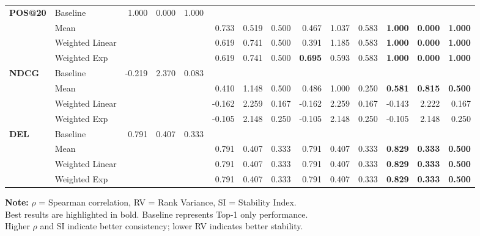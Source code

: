 \documentclass{article}
\begin{document}
\begin{table}[htbp]
\begin{tabular}{@{}llrrr|rrr|rrr|rrr@{}}
\multirow{4}{*}{\textbf{POS@20}} 
& Baseline & 1.000 & 0.000 & 1.000 & & & & & & & & & \\
& Mean & & & & 0.733 & 0.519 & 0.500 & 0.467 & 1.037 & 0.583 & \textbf{1.000} & \textbf{0.000} & \textbf{1.000} \\
& Weighted Linear & & & & 0.619 & 0.741 & 0.500 & 0.391 & 1.185 & 0.583 & \textbf{1.000} & \textbf{0.000} & \textbf{1.000} \\
& Weighted Exp & & & & 0.619 & 0.741 & 0.500 & \textbf{0.695} & 0.593 & 0.583 & \textbf{1.000} & \textbf{0.000} & \textbf{1.000} \\
\midrule

\multirow{4}{*}{\textbf{NDCG}} 
& Baseline & -0.219 & 2.370 & 0.083 & & & & & & & & & \\
& Mean & & & & 0.410 & 1.148 & 0.500 & 0.486 & 1.000 & 0.250 & \textbf{0.581} & \textbf{0.815} & \textbf{0.500} \\
& Weighted Linear & & & & -0.162 & 2.259 & 0.167 & -0.162 & 2.259 & 0.167 & -0.143 & 2.222 & 0.167 \\
& Weighted Exp & & & & -0.105 & 2.148 & 0.250 & -0.105 & 2.148 & 0.250 & -0.105 & 2.148 & 0.250 \\
\midrule

\multirow{4}{*}{\textbf{DEL}} 
& Baseline & 0.791 & 0.407 & 0.333 & & & & & & & & & \\
& Mean & & & & 0.791 & 0.407 & 0.333 & 0.791 & 0.407 & 0.333 & \textbf{0.829} & \textbf{0.333} & \textbf{0.500} \\
& Weighted Linear & & & & 0.791 & 0.407 & 0.333 & 0.791 & 0.407 & 0.333 & \textbf{0.829} & \textbf{0.333} & \textbf{0.500} \\
& Weighted Exp & & & & 0.791 & 0.407 & 0.333 & 0.791 & 0.407 & 0.333 & \textbf{0.829} & \textbf{0.333} & \textbf{0.500} \\

\bottomrule
\end{tabular}
\begin{flushleft}
\textbf{Note:} $\rho$ = Spearman correlation, RV = Rank Variance, SI = Stability Index. \\
Best results are highlighted in bold. Baseline represents Top-1 only performance. \\
Higher $\rho$ and SI indicate better consistency; lower RV indicates better stability.
\end{flushleft}
\end{table}
\end{document}
